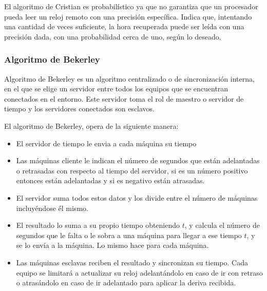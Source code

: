 				El algoritmo de Cristian es probabilístico ya que no garantiza que un procesador pueda 	leer un reloj remoto con una precisión específica. Indica que, intentando una cantidad de veces suficiente, la hora recuperada puede ser leída con una precisión dada, con una probabilidad cerca de uno, según lo deseado.
		
			
			\subsubsection{Algoritmo de Bekerley}
			
		 Algoritmo de Bekerley \cite{Gusella1985} es un algoritmo centralizado o de sincronizaci\'on interna, en el que  se elige un servidor  entre todos los equipos que se encuentran conectados en el entorno. Este servidor toma el rol de maestro o  servidor de tiempo y los servidores conectados son esclavos.  
		 
			El algoritmo de Bekerley,   opera de la siguiente manera: 
		 
	  \begin{itemize} 
			 
		\item 	El servidor de tiempo le envia a cada máquina su tiempo
		\item	Las máquinas cliente le indican el número de segundos que están adelantadas o retrasadas con respecto al tiempo del servidor, si es un número positivo entonces están adelantadas y si es negativo están atrasadas.
		\item	El servidor suma todos estos datos y los divide entre el número de máquinas incluyéndose él mismo.
		\item 	El resultado lo suma a su propio tiempo obteniendo $t$, y calcula el número de segundos que le falta o le sobra a una máquina para llegar a ese tiempo $t$, y se lo envía a la máquina. Lo mismo hace para cada máquina.
		\item	Las máquinas esclavas reciben el resultado y sincronizan su tiempo.	Cada equipo se limitará a actualizar su reloj adelantándolo en caso de ir con retraso o atrasándolo en caso de ir adelantado para aplicar la deriva recibida.				 
		\end{itemize}		
				
